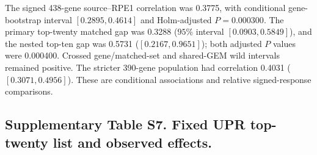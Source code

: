 \documentclass[a4paper,fleqn]{cas-sc}
\makeatletter
\DeclareRobustCommand{\rev}[1]{{\color{red}\def\@citecolor{black}\def\@linkcolor{red}\def\@urlcolor{red}#1}}
\makeatother
\begin{document}
\rev{The signed 438-gene source--RPE1 correlation was 0.3775, with conditional gene-bootstrap interval $[0.2895,0.4614]$ and Holm-adjusted $P=0.000300$.} \rev{The primary top-twenty matched gap was 0.3288 ($95\%$ interval $[0.0903,0.5849]$), and the nested top-ten gap was 0.5731 ($[0.2167,0.9651]$); both adjusted $P$ values were 0.000400.} \rev{Crossed gene/matched-set and shared-GEM wild intervals remained positive.} \rev{The stricter 390-gene population had correlation 0.4031 ($[0.3071,0.4956]$).} \rev{These are conditional associations and relative signed-response comparisons.}

\subsection*{\rev{Supplementary Table S7. Fixed UPR top-twenty list and observed effects.}}
\end{document}
